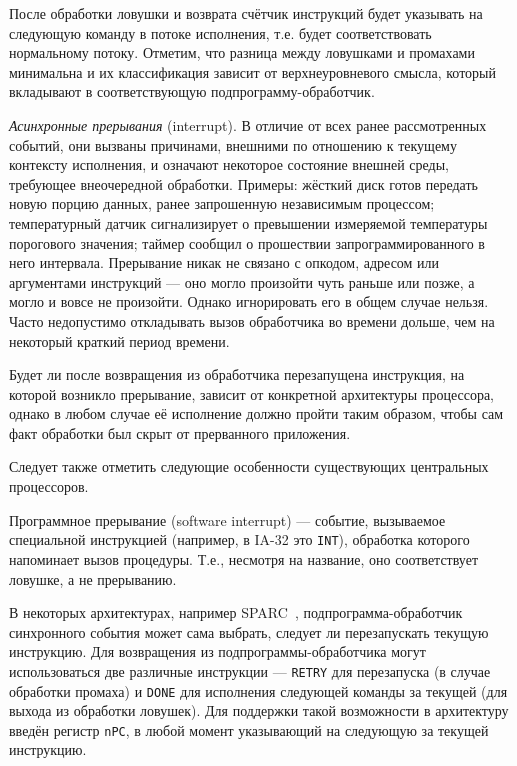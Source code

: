 \begin{itemize*}
    После обработки ловушки и возврата счётчик инструкций будет указывать на следующую команду в потоке исполнения, т.е. будет соответствовать нормальному потоку. Отметим, что разница между ловушками и промахами минимальна и их классификация зависит от верхнеуровневого смысла, который вкладывают в соответствующую подпрограмму-обработчик.

    \item \textit{Асинхронные прерывания} (\abbr interrupt). В отличие от всех ранее рассмотренных событий, они вызваны причинами, внешними по отношению к текущему контексту исполнения, и означают некоторое состояние внешней среды, требующее внеочередной обработки. Примеры: жёсткий диск готов передать новую порцию данных, ранее запрошенную независимым процессом; температурный датчик сигнализирует о превышении измеряемой температуры порогового значения; таймер сообщил о прошествии запрограммированного в него интервала. Прерывание никак не связано с опкодом, адресом или аргументами инструкций --- оно могло произойти чуть раньше или позже, а могло и вовсе не произойти. Однако игнорировать его в общем случае нельзя. Часто недопустимо откладывать вызов обработчика во времени дольше, чем на некоторый краткий период времени.

    Будет ли после возвращения из обработчика перезапущена инструкция, на которой возникло прерывание, зависит от конкретной архитектуры процессора, однако в любом случае её исполнение должно пройти таким образом, чтобы сам факт обработки был скрыт от прерванного приложения.
\end{itemize*}

Следует также отметить следующие особенности существующих центральных процессоров.
\begin{enumerate*}
    \item Программное прерывание (\abbr software interrupt) --- событие, вызываемое специальной инструкцией (например, в IA-32 это \texttt{INT}), обработка которого напоминает вызов процедуры. Т.е., несмотря на название, оно соответствует ловушке, а не прерыванию.
    \item В некоторых архитектурах, например SPARC~\cite{weaver1994sparc}, подпрограмма-обработчик синхронного события может сама выбрать, следует ли перезапускать текущую инструкцию. Для возвращения из подпрограммы-обработчика могут использоваться две различные инструкции --- \texttt{RETRY} для перезапуска (в случае обработки промаха) и \texttt{DONE} для исполнения следующей команды за текущей (для выхода из обработки ловушек). Для поддержки такой возможности в архитектуру введён регистр \texttt{nPC}, в любой момент указывающий на следующую за текущей инструкцию. 
\end{enumerate*}

